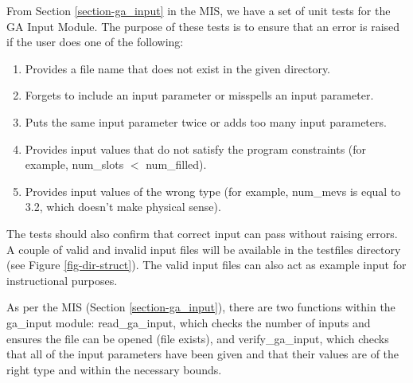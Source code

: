 \documentclass[12pt, titlepage]{article}
\begin{document}
From Section \ref{section-ga_input} in the MIS, we have a set of unit tests for 
the GA Input Module. The purpose of these tests is to ensure that an error is 
raised if the user does one of the following:
\begin{enumerate}
	\item Provides a file name that does not exist in the given directory.
	\item Forgets to include an input parameter or misspells an input parameter.
	\item Puts the same input parameter twice or adds too many input parameters.
	\item Provides input values that do not satisfy the program constraints 
	(for example, num\_slots $<$ num\_filled).
	\item Provides input values of the wrong type (for example, num\_mevs is 
	equal to 3.2, which doesn't make physical sense).
\end{enumerate}
The tests should also confirm that correct input can pass without raising 
errors. A couple of valid and invalid input files will be available in the 
testfiles directory (see Figure \ref{fig-dir-struct}). The valid input files 
can also act as example input for instructional purposes.

  

As per the MIS (Section \ref{section-ga_input}), there are two functions within 
the ga\_input module: read\_ga\_input, which checks the number of inputs and 
ensures the file can be opened (file exists), and verify\_ga\_input, which 
checks that all of the input parameters have been given and that their values 
are of the right type and within the necessary bounds.

\end{document}
